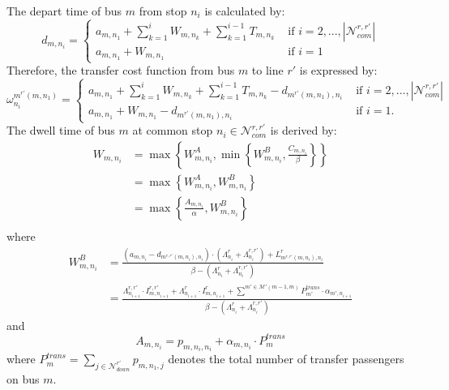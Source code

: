 \documentclass[smallextended]{svjour3}       %
\begin{document}
\begin{Abstract}
The depart time of bus $m$ from stop $n_{i}$ is calculated by:
\begin{equation}
    \label{equ:d_com}
    d_{m,n_{i}} = 
    \begin{cases}
        a_{m,n_{1}} + \sum\limits_{k=1}^{i} W_{m,n_{k}} + \sum\limits_{k=1}^{i-1} T_{m,n_{k}} &\text{ if } i=2,...,\left|\mathcal{N}_{com}^{r,r'}\right|\\
        a_{m,n_{1}}+W_{m,n_{1}} &\text{ if } i=1
    \end{cases}
\end{equation}
Therefore, the transfer cost function from bus $m$ to line $r'$ is expressed by:
\begin{equation}
    \omega_{n_i}^{m^{r'}\left(m,n_{1}\right)}=  
    \begin{cases}
        a_{m,n_{1}} + \sum\limits_{k=1}^{i} W_{m,n_{k}} + \sum\limits_{k=1}^{i-1} T_{m,n_{k}}-d_{m^{r'}\left(m,n_{1}\right),n_{i}}
        &\text{ if }i=2,...,\left|\mathcal{N}_{com}^{r,r'}\right|\\
        a_{m,n_{1}} + W_{m,n_{1}}-d_{m^{r'}\left(m,n_{1}\right),n_{i}}
        &\text{ if }i=1.
    \end{cases}
\end{equation}    
The dwell time of bus $m$ at common stop $n_{i}\in\mathcal{N}_{com}^{r,r'}$ is derived by:
\begin{equation}
    \label{equ:W_com}
    \begin{split}
        W_{m,n_{i}} &= \max \left\{W_{m,n_{i}}^{A},\min \left\{W_{m,n_{i}}^{B},\frac{C_{m,n_{i}}}{\beta}\right\}\right\}\\
        & = \max \left\{W_{m,n_{i}}^{A},W_{m,n_{i}}^{B} \right\}\\
        & = \max \left\{\frac{A_{m,n_{i}}}{\alpha},W_{m,n_{i}}^{B} \right\}\\
    \end{split}
\end{equation}
where %
\begin{equation}
    \begin{split}
        W_{m,n_{i}}^{B} &= \frac{\left(a_{m,n_{i}}-d_{m^{r,r'}(m,n_{i}),n_{i}}\right)\cdot \left(\Lambda_{n_{i}}^{r}+\Lambda_{n_{i}}^{r,r'}\right)
        +L_{m^{r,r'}(m,n_{i}),n_{i}}^{r}}
        {\beta-\left(\Lambda_{n_{i}}^{r}+\Lambda_{n_{i}}^{r,r'}\right)}\\
        &= \frac{\Lambda_{n_{i+1}}^{r,r'}\cdot I_{m,n_{i+1}}^{r,r'} + \Lambda_{n_{i+1}}^{r}\cdot I_{m,n_{i+1}}^{r} + 
        \sum\limits^{m'\in\mathcal{M'}(m-1,m)} P_{m'}^{trans}\cdot\alpha_{m',n_{i+1}}}
        {\beta-\left(\Lambda_{n_{i}}^{r}+\Lambda_{n_{i}}^{r,r'}\right)}
    \end{split}
\end{equation}
and
\begin{equation}
    A_{m,n_{i}} = p_{m,n_{i},n_{i}} + \alpha_{m,n_{i}}\cdot P_{m}^{trans}
\end{equation}
where $P_{m}^{trans}=\sum\limits_{j\in\mathcal{N}_{down}^{r'}} p_{m,n_{1},j}$ denotes the total number of transfer passengers on bus $m$.


\end{Abstract}
\end{document}

